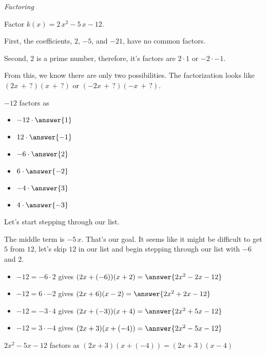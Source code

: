 \documentclass{ximera}
\begin{document}
\begin{example} \textit{Factoring}

Factor $k(x) = 2 \, x^2 - 5 \, x - 12$.


\begin{explanation}

First, the coefficients, $2$, $-5$, and $-21$, have no common factors.


Second, $2$ is a prime number, therefore, it's factors are $2 \cdot 1$ or $-2 \cdot -1$.

From this, we know there are only two possibilities. The factorization looks like $(2 x \, + \, ?) (x \, + \, ?)$ or $(-2 x \, + \, ?) (-x \, + \, ?)$.






$-12$ factors as 
\begin{itemize}
\item $-12 \cdot \answer{1}$
\item $12 \cdot \answer{-1}$
\item $-6 \cdot \answer{2}$
\item $6 \cdot \answer{-2}$
\item $-4 \cdot \answer{3}$
\item $4 \cdot \answer{-3}$  
\end{itemize}



Let's start stepping through our list.

The middle term is $-5 \, x$.  That's our goal. It seems like it might be difficult to get $5$ from $12$, let's skip $12$ in our list and begin stepping through our list with $-6$ and $2$.

\begin{itemize}

\item $-12 = -6 \cdot 2$ gives $(2 x + (-6)) (x + 2) = \answer{2 x^2 - 2 x - 12}$
\item $-12 = 6 \cdot -2$ gives $(2 x + 6) (x - 2) = \answer{2 x^2 + 2 x -12}$
\item $-12 = -3 \cdot 4$ gives $(2 x + (-3)) (x + 4) = \answer{2 x^2 + 5 x - 12}$
\item $-12 = 3 \cdot -4$ gives $(2 x + 3) (x + (-4)) = \answer{2 x^2 - 5 x -12}$
\end{itemize}

$2 x^2 - 5 x - 12$ factors as $(2 x + 3) (x + (-4)) = (2 x + 3)(x - 4)$


\end{explanation}
\end{example}
\end{document}
